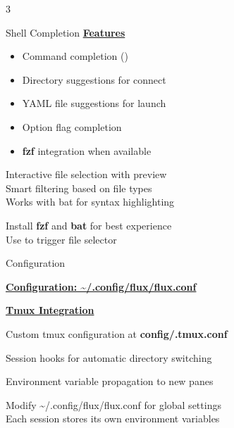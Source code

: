 \documentclass[10pt,a4paper]{article}
\begin{document}
\begin{multicols}{3}
\begin{textbox}{Shell Completion}
\underline{\textbf{Features}}
\begin{itemize}
    \item Command completion ()
    \item Directory suggestions for connect
    \item YAML file suggestions for launch
    \item Option flag completion
    \item \textbf{fzf} integration when available
\end{itemize}


Interactive file selection with preview\\

Smart filtering based on file types\\

Works with bat for syntax highlighting\\


Install \textbf{fzf} and \textbf{bat} for best experience\\

Use   to trigger file selector\\

\end{textbox}

\begin{textbox}{Configuration}

\underline{\textbf{Configuration: \textasciitilde/.config/flux/flux.conf}}




\underline{\textbf{Tmux Integration}}

Custom tmux configuration at \textbf{config/.tmux.conf}

Session hooks for automatic directory switching

Environment variable propagation to new panes


Modify \textasciitilde/.config/flux/flux.conf for global settings\\

Each session stores its own environment variables\\


\end{textbox}
\end{multicols}
\end{document}
